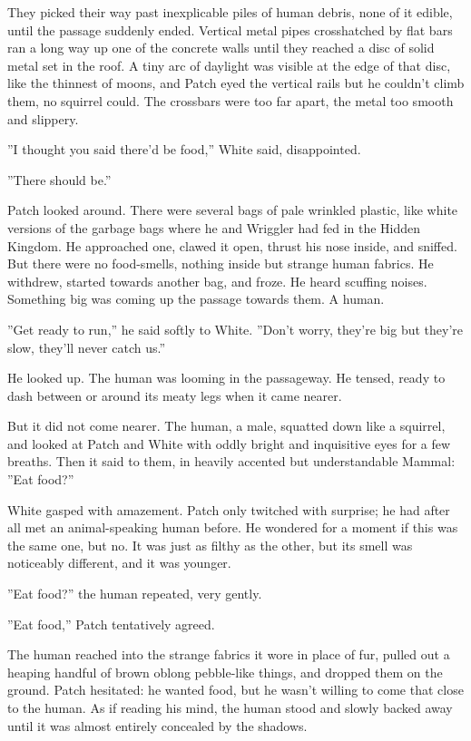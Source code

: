 \documentclass[12pt]{book}
\begin{document}
They picked their way past inexplicable piles of human debris, none of it edible, until the passage suddenly ended. Vertical metal pipes crosshatched by flat bars ran a long way up one of the concrete walls until they reached a disc of solid metal set in the roof. A tiny arc of daylight was visible at the edge of that disc, like the thinnest of moons, and Patch eyed the vertical rails %
but he couldn't climb them, no squirrel could. The crossbars were too far apart, the metal too smooth and slippery.

''I thought you said there'd be food,'' White said, disappointed.

''There should be.''

Patch looked around. There were several bags of pale wrinkled plastic, like white versions of the garbage bags where he and Wriggler had fed in the Hidden Kingdom. He approached one, clawed it open, thrust his nose inside, and sniffed. But there were no food-smells, nothing inside but strange human fabrics. He withdrew, started towards another bag, and froze. He heard scuffing noises. Something big was coming up the passage towards them. A human.

''Get ready to run,'' he said softly to White. ''Don't worry, they're big but they're slow, they'll never catch us.''

He looked up. The human was looming in the passageway. He tensed, ready to dash between or around its meaty legs when it came nearer.

But it did not come nearer. The human, a male, squatted down like a squirrel, and looked at Patch and White with oddly bright and inquisitive eyes for a few breaths. Then it said to them, in heavily accented but understandable Mammal: ''Eat food?''

White gasped with amazement. Patch only twitched with surprise; he had after all met an animal-speaking human before. He wondered for a moment if this was the same one, but no. It was just as filthy as the other, but its smell was noticeably different, and it was younger.

''Eat food?'' the human repeated, very gently.

''Eat food,'' Patch tentatively agreed.

The human reached into the strange fabrics it wore in place of fur, pulled out a heaping handful of brown oblong pebble-like things, and dropped them on the ground. Patch hesitated: he wanted food, but he wasn't willing to come that close to the human. As if reading his mind, the human stood and slowly backed away until it was almost entirely concealed by the shadows.
\end{document}
